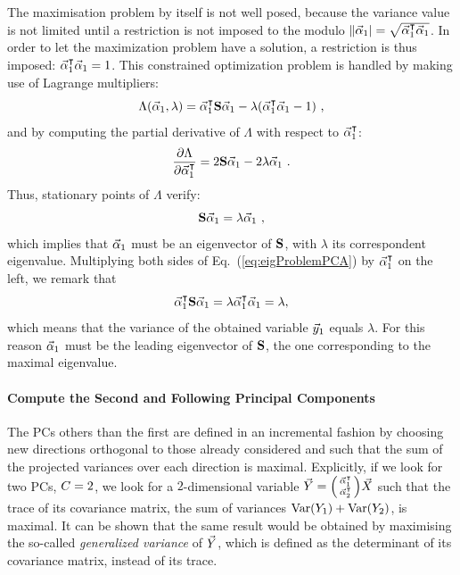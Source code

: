 The maximisation problem by itself is not well posed, because the variance value is not limited until a restriction is not imposed to the modulo $\|\vec{\alpha}_1| = \sqrt{\vec{\alpha}_1^\intercal\vec{\alpha}_1}$. In order to let the maximization problem have a solution, a restriction is thus imposed: $\vec{\alpha}_1^\intercal\vec{\alpha}_1 = 1$. 
This constrained  optimization problem is handled by making use of Lagrange multipliers:
\begin{equation}
\Lambda(\vec{\alpha}_1, \lambda) = \vec{\alpha}_1^\intercal\textbf{S}\vec{\alpha}_1 - \lambda(\vec{\alpha}_1^\intercal\vec{\alpha}_1-1) \mbox{ ,}
\end{equation}
and by computing the partial derivative of $\Lambda$ with respect to $\vec{\alpha}_1^\intercal$:
\begin{equation}
\frac{\partial\Lambda}{\partial\vec{\alpha}_1^\intercal} = 2\textbf{S}\vec{\alpha}_1-2\lambda\vec{\alpha}_1 \mbox{ .}
\end{equation}
Thus, stationary points of $\Lambda$ verify:
\begin{equation}\label{eq:eigProblemPCA}
\textbf{S}\vec{\alpha}_1 = \lambda\vec{\alpha}_1 \mbox{ ,}
\end{equation}
which implies that $\vec{\alpha}_1$ must be an eigenvector of $\textbf{S}$, with $\lambda$ its correspondent eigenvalue. Multiplying both sides of Eq.~(\ref{eq:eigProblemPCA}) by $\vec{\alpha}_1^\intercal$ on the left, we remark that
\begin{equation}
\vec{\alpha}_1^\intercal\textbf{S}\vec{\alpha}_1 = \lambda\vec{\alpha}_1^\intercal\vec{\alpha}_1 = \lambda, 
\end{equation}
which means that the variance of the obtained variable $\vec{y}_1$ equals $\lambda$. For this reason $\vec{\alpha}_1$ must be the leading eigenvector of $\textbf{S}$, the one corresponding to the maximal eigenvalue.

\paragraph*{Compute the Second and Following Principal Components}
The PCs others than the first are defined in an incremental fashion by choosing new directions orthogonal to those already considered and such that the sum of the projected variances over each direction is maximal. Explicitly, if we look for two PCs, \ie $C = 2$,  we look for a $2$-dimensional variable $\vec{Y} = \begin{psmallmatrix} \vec{\alpha}_1^\intercal \\ \vec{\alpha}_2^\intercal \end{psmallmatrix} \vec{X}$ such that the trace of its covariance matrix, \ie the sum of variances $\mathrm{Var}(Y_1)+\mathrm{Var}(Y_2)$, is maximal. It can be shown that the same result would be obtained by maximising the so-called \emph{generalized variance} of $\vec{Y}$, which is defined as the determinant of its covariance matrix, instead of its trace. \\

